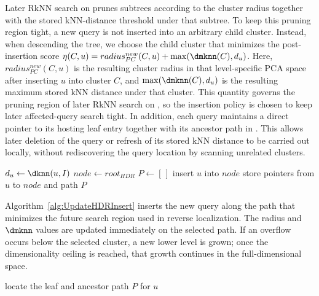 Later RkNN search on \hdrtree prunes subtrees according to the cluster radius together with the stored kNN-distance threshold under that subtree. To keep this pruning region tight, a new query is not inserted into an arbitrary child cluster. Instead, when descending the tree, we choose the child cluster that minimizes the post-insertion score $\eta(C,u)=radius^{new}_{PC}(C,u)+\max(\dmknn(C),d_u)$. Here, $radius^{new}_{PC}(C,u)$ is the resulting cluster radius in that level-specific PCA space after inserting $u$ into cluster $C$, and $\max(\dmknn(C),d_u)$ is the resulting maximum stored kNN distance under that cluster. This quantity governs the pruning region of later RkNN search on \hdrtree, so the insertion policy is chosen to keep later affected-query search tight. In addition, each query maintains a direct pointer to its hosting leaf entry together with its ancestor path in \hdrtree. This allows later deletion of the query or refresh of its stored kNN distance to be carried out locally, without rediscovering the query location by scanning unrelated clusters.

\begin{algorithm}[t]
\caption{Update\_HDR\_Insert($u$)}
\label{alg:UpdateHDRInsert}
$d_u \leftarrow \dknn(u,I)$\;
$node \leftarrow root_{HDR}$\;
$P \leftarrow [\,]$\;
insert $u$ into $node$\;
store pointers from $u$ to $node$ and path $P$\;
\end{algorithm}

Algorithm~\ref{alg:UpdateHDRInsert} inserts the new query along the path that minimizes the future search region used in reverse localization. The radius and $\dmknn$ values are updated immediately on the selected path. If an overflow occurs below the selected cluster, a new lower level is grown; once the dimensionality ceiling is reached, that growth continues in the full-dimensional space.

\begin{algorithm}[t]
\caption{HDR\_Adjust($u$, mode)}
\label{alg:UpdateHDRAdjust}
locate the leaf and ancestor path $P$ for $u$\;
\end{algorithm}

